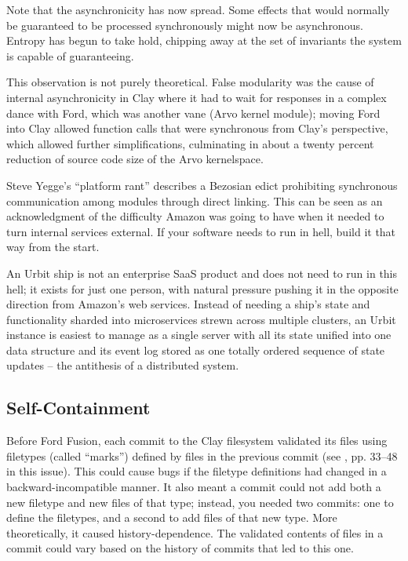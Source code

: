 \documentclass[twoside]{article}
\begin{document}
Note that the asynchronicity has now spread. Some effects that would normally be guaranteed to be processed synchronously might now be asynchronous. Entropy has begun to take hold, chipping away at the set of invariants the system is capable of guaranteeing.

This observation is not purely theoretical. False modularity was the cause of internal asynchronicity in Clay where it had to wait for responses in a complex dance with Ford, which was another vane (Arvo kernel module); moving Ford into Clay allowed function calls that were synchronous from Clay’s perspective, which allowed further simplifications, culminating in about a twenty percent reduction of source code size of the Arvo kernelspace.

Steve Yegge's ``platform rant'' \citep{Yegge2011} describes a Bezosian
edict prohibiting synchronous communication among modules through direct
linking. This can be seen as an acknowledgment of the difficulty Amazon
was going to have when it needed to turn internal services external. If
your software needs to run in hell, build it that way from the start.

An Urbit ship is not an enterprise SaaS product and does not need to run in this hell; it exists for just one person, with natural pressure pushing it in the opposite direction from Amazon’s web services. Instead of needing a ship’s state and functionality sharded into microservices strewn across multiple clusters, an Urbit instance is easiest to manage as a single server with all its state unified into one data structure and its event log stored as one totally ordered sequence of state updates – the antithesis of a distributed system.

\subsection{Self-Containment}

Before Ford Fusion, each commit to the Clay filesystem validated its files using filetypes (called ``marks'') defined by files in the previous commit (see \citet{Davis2024}, pp. 33–48 in this issue). This could cause bugs if the filetype definitions had changed in a backward-incompatible manner. It also meant a commit could not add both a new filetype and new files of that type; instead, you needed two commits: one to define the filetypes, and a second to add files of that new type. More theoretically, it caused history-dependence. The validated contents of files in a commit could vary based on the history of commits that led to this one.
\end{document}
